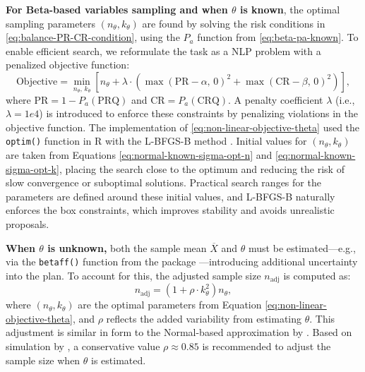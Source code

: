 \textbf{For Beta-based variables sampling and when \(\theta\) is known},
the optimal sampling parameters \((n_\theta, k_\theta)\) are found by solving the
risk conditions in \eqref{eq:balance-PR-CR-condition}, using the \(P_a\) function
from \eqref{eq:beta-pa-known}. To enable efficient search, we reformulate the task
as a NLP problem with a penalized objective function:
\begin{equation}
\text{Objective} = \min_{n_\theta,\, k_\theta} \left[ 
n_\theta + \lambda \cdot 
\left( \max\left(\text{PR} - \alpha,\, 0\right)^2 + \max\left(\text{CR} - \beta,\, 0\right)^2 
\right) \right],
  \label{eq:non-linear-objective-theta}
\end{equation}
where \(\text{PR} = 1 - P_a(\text{PRQ})\) and
\(\text{CR} = P_a(\text{CRQ})\). A penalty coefficient
\(\lambda\) (i.e., \(\lambda = 1e4\)) is introduced to enforce these constraints
by penalizing violations in the objective function.
The implementation of \eqref{eq:non-linear-objective-theta} used the \texttt{optim()}
function in R with the L-BFGS-B method \citep{byrd1995limited}.
Initial values for \((n_\theta, k_\theta)\) are taken from Equations \eqref{eq:normal-known-sigma-opt-n} and
\eqref{eq:normal-known-sigma-opt-k}, placing the search close to the optimum and
reducing the risk of slow convergence or suboptimal solutions. Practical search ranges
for the parameters are defined around these initial values, and L-BFGS-B naturally
enforces the box constraints, which improves stability and avoids unrealistic proposals.

\textbf{When \(\theta\) is unknown,} both the sample mean \(\overline{X}\) and
\(\theta\) must be estimated---e.g., via the \texttt{betaff()} function from the
 package \citep{Yee2025VGAM}---introducing additional uncertainty into
the plan. To account for this, the adjusted sample size \(n_\text{adj}\) is computed as:
\begin{equation}
n_\text{adj} = \left(1 + \rho \cdot k_\theta^2 \right) n_\theta, 
  \label{eq:beta-unknown-m-approximated}
\end{equation}
where \((n_\theta, k_\theta)\) are the optimal parameters from Equation
\eqref{eq:non-linear-objective-theta}, and \(\rho\) reflects the added variability
from estimating \(\theta\). This adjustment is similar in form to the Normal-based
approximation by \citet{wilrich2004single}. Based on simulation by \citet{govindaraju2015sampling},
a conservative value \(\rho \approx 0.85\) is recommended to adjust the sample
size when \(\theta\) is estimated.

